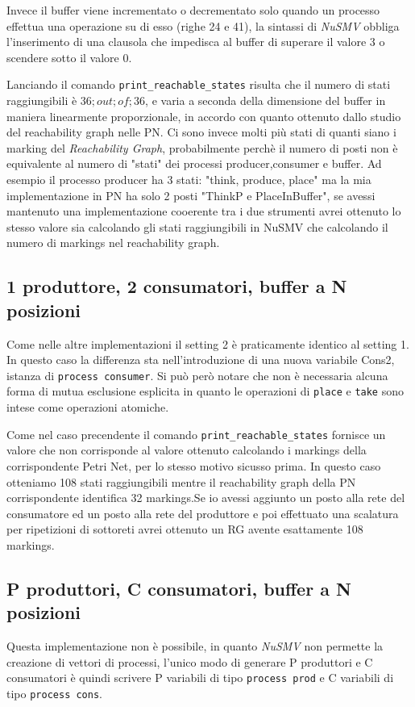 \documentclass[a4paper]{article}
\begin{document}
Invece il buffer viene incrementato o decrementato solo quando un processo effettua una operazione su di esso (righe 24 e 41), la sintassi di \textit{NuSMV} obbliga l'inserimento di una clausola che impedisca al buffer di superare il valore 3 o scendere sotto il valore 0.

Lanciando il comando \texttt{print\_reachable\_states} risulta che il numero di stati raggiungibili è $36 ; out ; of ; 36$, e varia a seconda della dimensione del buffer in maniera linearmente proporzionale, in accordo con quanto ottenuto dallo studio del reachability graph nelle PN.
Ci sono invece molti più stati di quanti siano i marking del \textit{Reachability Graph}, probabilmente perchè il numero di posti non è equivalente al numero di "stati" dei processi producer,consumer e buffer.
Ad esempio il processo producer ha 3 stati: "think, produce, place" ma la mia implementazione in PN ha solo 2 posti "ThinkP e PlaceInBuffer", se avessi mantenuto una implementazione cooerente tra i due strumenti avrei ottenuto lo stesso valore sia calcolando gli stati raggiungibili in NuSMV che calcolando il numero di markings nel reachability graph.
\newpage
\subsection{1 produttore, 2 consumatori, buffer a N posizioni}

Come nelle altre implementazioni il setting 2 è praticamente identico al setting 1. In questo caso la differenza sta nell'introduzione di una nuova variabile Cons2, istanza di \texttt{process consumer}.
Si può però notare che non è necessaria alcuna forma di mutua esclusione esplicita in quanto le operazioni di \texttt{place} e \texttt{take} sono intese come operazioni atomiche.

Come nel caso precendente il comando \texttt{print\_reachable\_states} fornisce un valore che non corrisponde al valore ottenuto calcolando i markings della corrispondente Petri Net, per lo stesso motivo sicusso prima.
In questo caso otteniamo 108 stati raggiungibili mentre il reachability graph della PN corrispondente identifica 32 markings.Se io avessi aggiunto un posto alla rete del consumatore ed un posto alla rete del produttore e poi effettuato una scalatura per ripetizioni di sottoreti avrei ottenuto un RG avente esattamente 108 markings.
\newpage
\subsection{P produttori, C consumatori, buffer a N posizioni}
Questa implementazione non è possibile, in quanto \emph{NuSMV} non permette la creazione di vettori di processi, l'unico modo di generare P produttori e C consumatori è quindi scrivere P variabili di tipo \texttt{process prod} e C variabili di tipo \texttt{process cons}.
\end{document}
